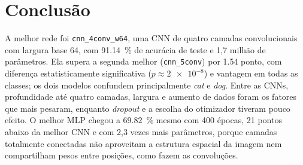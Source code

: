 \documentclass[11pt,a4paper]{article}
\newcommand{\w}[1]{\textit{#1}}
\newcommand{\code}[1]{\texttt{#1}}
\begin{document}
\section{Conclusão}

A melhor rede foi \code{cnn\_4conv\_w64}, uma CNN de quatro camadas convolucionais com largura base 64, com \SI{91,14}{\percent} de acurácia de teste e 1,7 milhão de parâmetros. Ela supera a segunda melhor (\code{cnn\_5conv}) por \num{1,54} ponto, com diferença estatisticamente significativa ($p \approx \num{2e-8}$) e vantagem em todas as classes; os dois modelos confundem principalmente \w{cat} e \w{dog}. Entre as CNNs, profundidade até quatro camadas, largura e aumento de dados foram os fatores que mais pesaram, enquanto \textit{dropout} e a escolha do otimizador tiveram pouco efeito. O melhor MLP chegou a \SI{69,82}{\percent} mesmo com 400 épocas, 21 pontos abaixo da melhor CNN e com 2,3 vezes mais parâmetros, porque camadas totalmente conectadas não aproveitam a estrutura espacial da imagem nem compartilham pesos entre posições, como fazem as convoluções.
\end{document}
